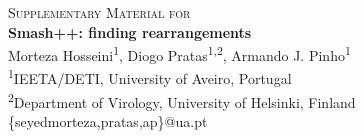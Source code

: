 
\begin{titlepage}
  \centering
  \vspace*{10mm}
  \Large\textsc{Supplementary Material for} \\[3mm]
  \huge\textbf{Smash++: finding rearrangements} \\[10mm]
  \Large Morteza Hosseini\textsuperscript{1}, Diogo Pratas\textsuperscript{1,2}, Armando J. Pinho\textsuperscript{1} \\[4mm]
  \normalsize \textsuperscript{1}IEETA/DETI, University of Aveiro, Portugal \\ \textsuperscript{2}Department of Virology, University of Helsinki, Finland \\[2mm]
  {\ttfamily\{seyedmorteza,pratas,ap\}@ua.pt}
  
  \vspace{\fill}
  \thispagestyle{empty}
  \raggedright
  \normalsize\tableofcontents
  \end{titlepage}